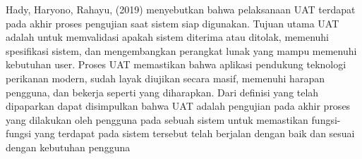 Hady, Haryono, Rahayu, (2019) menyebutkan bahwa pelaksanaan UAT terdapat pada akhir proses pengujian saat sistem siap digunakan. Tujuan utama UAT adalah untuk memvalidasi apakah sistem diterima atau ditolak, memenuhi spesifikasi sistem, dan mengembangkan perangkat lunak yang mampu memenuhi kebutuhan user. Proses UAT memastikan bahwa aplikasi pendukung teknologi perikanan modern, sudah layak diujikan secara masif, memenuhi harapan pengguna, dan bekerja seperti yang diharapkan. Dari definisi yang telah dipaparkan dapat disimpulkan bahwa UAT adalah pengujian pada akhir proses yang dilakukan oleh pengguna pada sebuah sistem untuk memastikan fungsi-fungsi yang terdapat pada sistem tersebut telah berjalan dengan baik dan sesuai dengan kebutuhan pengguna